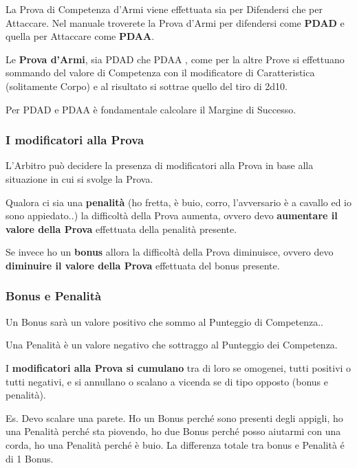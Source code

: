 \documentclass[12pt,a4paper,twoside,openany]{book}
\begin{document}
\begin{multicols}{2}
La Prova di Competenza d'Armi viene effettuata sia per Difendersi che per Attaccare. Nel manuale troverete la Prova d'Armi per difendersi come \textbf{PDAD} e quella per Attaccare come \textbf{PDAA}.
 
Le \textbf{Prova d'Armi}, sia PDAD che PDAA , come per la altre Prove si effettuano sommando del valore di Competenza con il modificatore di Caratteristica (solitamente Corpo) e al risultato si sottrae quello del tiro di 2d10.

Per PDAD e PDAA è fondamentale calcolare il Margine di Successo.

\subsubsection{I modificatori alla Prova}

L'Arbitro può decidere la presenza di modificatori alla Prova in base alla situazione in cui si svolge la Prova.

Qualora ci sia una \textbf{penalità} (ho fretta, è buio, corro, l'avversario è a cavallo ed io sono appiedato..) la difficoltà della Prova aumenta, ovvero devo \textbf{aumentare il valore della Prova} effettuata della penalità presente.

Se invece ho un \textbf{bonus} allora la difficoltà della Prova diminuisce, ovvero devo \textbf{diminuire il valore della Prova} effettuata del bonus presente.

\subsubsection{Bonus e Penalità}

Un Bonus sarà un valore positivo che sommo al Punteggio di Competenza..

Una Penalità è un valore negativo che sottraggo al Punteggio dei Competenza. 

I \textbf{modificatori alla Prova si cumulano} tra di loro se omogenei, tutti positivi o tutti negativi, e si annullano o scalano a vicenda se di tipo opposto (bonus e penalità).

Es. Devo scalare una parete. Ho un Bonus perché sono presenti degli appigli, ho una Penalità perché sta piovendo, ho due Bonus perché posso aiutarmi con una corda, ho una Penalità perché è buio. La differenza totale tra bonus e Penalità é di 1 Bonus.


\end{multicols}
\end{document}
